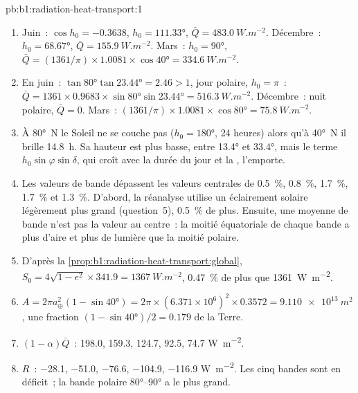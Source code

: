 \begin{solution}{pb:b1:radiation-heat-transport:1}
\begin{enumerate}
  \item Juin~: $\cos h_0 = -0.3638$, $h_0 = \ang{111.33}$, $\bar Q =
        \qty{483.0}{W.m^{-2}}$. Décembre~: $h_0 = \ang{68.67}$, $\bar Q =
        \qty{155.9}{W.m^{-2}}$. Mars~: $h_0 = \ang{90}$, $\bar Q = (1361/\pi)
        \times 1.0081 \times \cos\ang{40} = \qty{334.6}{W.m^{-2}}$.
  \item En juin~: $\tan\ang{80}\tan\ang{23.44} = 2.46 > 1$, jour polaire, $h_0 = \pi$~:
        $\bar Q = 1361 \times 0.9683 \times \sin\ang{80}\sin\ang{23.44} =
        \qty{516.3}{W.m^{-2}}$. Décembre~: nuit polaire, $\bar Q = 0$. Mars~:
        $(1361/\pi) \times 1.0081 \times \cos\ang{80} = \qty{75.8}{W.m^{-2}}$.
  \item À \ang{80}~N le Soleil ne se couche pas ($h_0 = \ang{180}$, 24 heures) alors qu'à
        \ang{40}~N il brille \qty{14.8}{h}. Sa hauteur est plus basse, entre
        \ang{13.4} et \ang{33.4}, mais le terme $h_0\sin\varphi\sin\delta$, qui
        croît avec la durée du jour et la , l'emporte.
  \item Les valeurs de bande dépassent les valeurs centrales de \qty{0.5}{\percent},
        \qty{0.8}{\percent}, \qty{1.7}{\percent}, \qty{1.7}{\percent} et
        \qty{1.3}{\percent}. D'abord, la réanalyse utilise un éclairement solaire légèrement plus
        grand (question~5), \qty{0.5}{\percent} de plus. Ensuite, une moyenne de bande
        n'est pas la valeur au centre~: la moitié équatoriale de chaque bande a plus
        d'aire et plus de lumière que la moitié polaire.
  \item D'après la \cref{prop:b1:radiation-heat-transport:global}, $S_0 = 4\sqrt{1-e^2}
        \times 341.9 = \qty{1367}{W.m^{-2}}$, \qty{0.47}{\percent} de plus que \qty{1361}{W.m^{-2}}.
  \item $A = 2\pi a_\oplus^2(1 - \sin\ang{40}) = 2\pi \times (6.371\times10^6)^2
        \times 0.3572 = \qty{9.110e13}{m^2}$, une fraction $(1 - \sin\ang{40})/2 =
        0.179$ de la Terre.
  \item $(1 - \alpha)\bar Q$~: \num{198.0}, \num{159.3}, \num{124.7}, \num{92.5},
        \num{74.7} \unit{W.m^{-2}}.
  \item $R$~: \num{-28.1}, \num{-51.0}, \num{-76.6}, \num{-104.9}, \num{-116.9}
        \unit{W.m^{-2}}. Les cinq bandes sont en déficit~; la bande polaire
        \ang{80}--\ang{90} a le plus grand.

\end{enumerate}
\end{solution}
